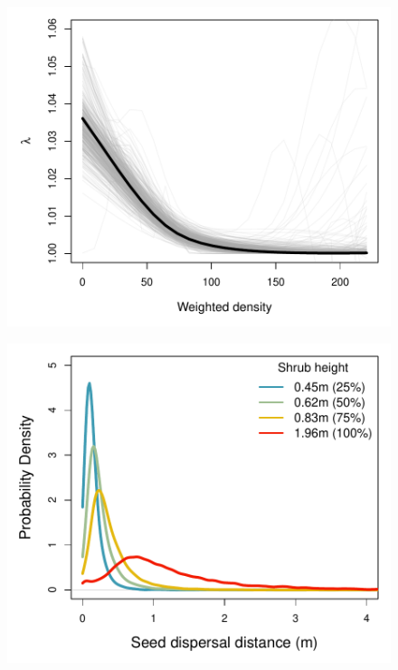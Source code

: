 \documentclass[11pt]{article}\usepackage[]{graphicx}\usepackage[]{color}
\begin{document}
\newpage
\begin{figure}[H]
  \begin{center}
    \includegraphics[width=\linewidth]{Figures/LambdaD}
  \caption{}
  \label{fig:lambda}
  \end{center}
\end{figure}

\newpage
\begin{figure}[H]
  \begin{center}
    \includegraphics[width=\linewidth]{Figures/Dkernels}
  \caption{}
  \label{fig:dispersal}
  \end{center}
\end{figure}
\end{document}
